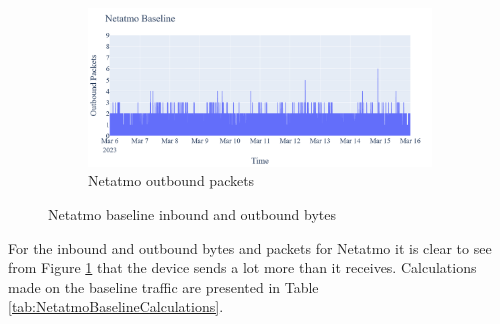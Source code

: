 \begin{figure}[H]
\begin{subfigure}[b]{0.4\textwidth}
    \end{subfigure}
    \begin{subfigure}[b]{0.4\textwidth}
        \includegraphics[width=\textwidth]{figures/Netatmo_Baseline_OutboundPackets.png}
        \caption{Netatmo outbound packets}
    \end{subfigure}
    \caption{Netatmo baseline inbound and outbound bytes}
    \label{Fig:NetatmoBaselineOutandInboundTraffic}
 \end{figure}

For the inbound and outbound bytes and packets for Netatmo it is clear to see from Figure \ref{Fig:NetatmoBaselineOutandInboundTraffic} that the device sends a lot more than it receives. Calculations made on the baseline traffic are presented in Table \ref{tab:NetatmoBaselineCalculations}. 

